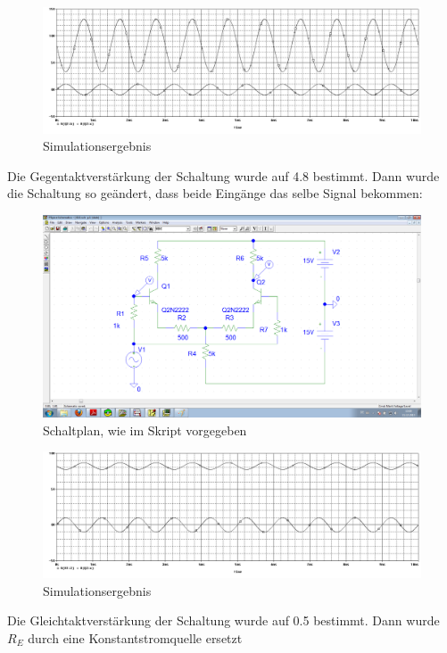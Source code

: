 \begin{figure}[H]
	\centering
	\includegraphics[width=\linewidth]{versuch6/spice/612.png}
	\caption{Simulationsergebnis}
\end{figure}
Die Gegentaktverstärkung der Schaltung wurde auf 4.8 bestimmt.
Dann wurde die Schaltung so geändert, dass beide Eingänge das selbe Signal bekommen:
\begin{figure}[H]
	\centering
	\includegraphics[width=\linewidth]{versuch6/spice/schem613.png}
	\caption{Schaltplan, wie im Skript vorgegeben}
\end{figure}
\begin{figure}[H]
	\centering
	\includegraphics[width=\linewidth]{versuch6/spice/613.png}
	\caption{Simulationsergebnis}
\end{figure}
Die Gleichtaktverstärkung der Schaltung wurde auf 0.5 bestimmt.
Dann wurde $R_E$ durch eine Konstantstromquelle ersetzt
